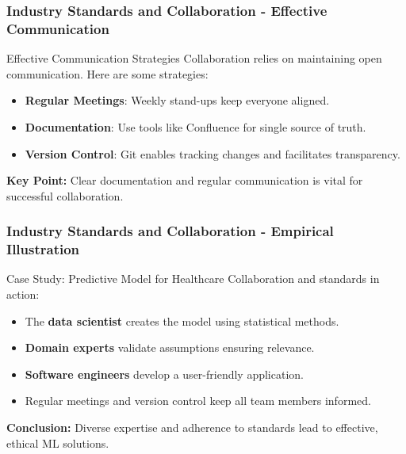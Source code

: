 \documentclass{beamer}
\begin{document}
\begin{frame}[fragile]
    \frametitle{Industry Standards and Collaboration - Effective Communication}
    \begin{block}{Effective Communication Strategies}
        Collaboration relies on maintaining open communication. Here are some strategies:
    \end{block}

    \begin{itemize}
        \item \textbf{Regular Meetings}: Weekly stand-ups keep everyone aligned.
        \item \textbf{Documentation}: Use tools like Confluence for single source of truth.
        \item \textbf{Version Control}: Git enables tracking changes and facilitates transparency.
    \end{itemize}
    
    \textbf{Key Point:} Clear documentation and regular communication is vital for successful collaboration.
\end{frame}

\begin{frame}[fragile]
    \frametitle{Industry Standards and Collaboration - Empirical Illustration}
    \begin{block}{Case Study: Predictive Model for Healthcare}
        Collaboration and standards in action:
    \end{block}

    \begin{itemize}
        \item The \textbf{data scientist} creates the model using statistical methods.
        \item \textbf{Domain experts} validate assumptions ensuring relevance.
        \item \textbf{Software engineers} develop a user-friendly application.
        \item Regular meetings and version control keep all team members informed.
    \end{itemize}

    \textbf{Conclusion:} Diverse expertise and adherence to standards lead to effective, ethical ML solutions.
\end{frame}
\end{document}
